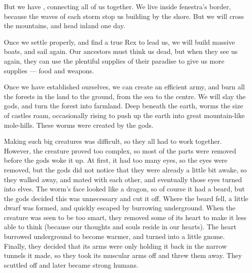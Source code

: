 \begin{multicols}{2}
\begin{exampletext}
  But we have , connecting all of us together.
  We live inside \gls{fenestra}'s border, because the waves of each \gls{storm} stop us building by the shore.
  But we will cross the mountains, and head inland one day.

  Once we settle properly, and find a true Rex to lead us, we will build massive boats, and sail again.
  Our ancestors must think us dead, but when they see us again, they can use the plentiful supplies of their paradise to give us more supplies --- food and weapons.

  Once we have established ourselves, we can create an efficient army, and burn all the forests in the land to the ground, from the sea to the centre.
  We will slay the gods, and turn the forest into farmland.
\else
  \noindent
  Deep beneath the earth, worms the size of castles roam, occasionally rising to push up the earth into great mountain-like mole-hills.
  These worms were created by the gods.

  Making such big creatures was difficult, so they all had to work together.
  However, the creature proved too complex, so most of the parts were removed before the gods woke it up.
  At first, it had too many eyes, so the eyes were removed, but the gods did not notice that they were already a little bit awake, so they walked away, and mated with each other, and eventually those eyes turned into elves.
  The worm's face looked like a dragon, so of course it had a beard, but the gods decided this was unnecessary and cut it off.
  Where the beard fell, a little dwarf was formed, and quickly escaped by burrowing underground.
  When the creature was seen to be too smart, they removed some of its heart to make it less able to think (because our thoughts and souls reside in our hearts).
  The heart burrowed underground to become warmer, and turned into a little gnome.
  Finally, they decided that its arms were only holding it back in the narrow tunnels it made, so they took its muscular arms off and threw them away.
  They scuttled off and later became strong humans.


\end{exampletext}
\end{multicols}
